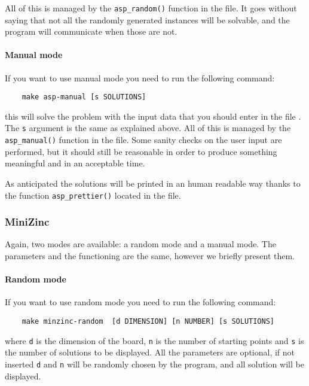 All of this is managed by the \texttt{asp_random()} function in the  file. 
It goes without saying that not all the randomly generated instances will be solvable, and the program will communicate when those are not.

\paragraph{Manual mode}

If you want to use manual mode you need to run the following command:
\begin{verbatim}
    make asp-manual [s SOLUTIONS]
\end{verbatim}
this will solve the problem with the input data that you should enter in the file . The \texttt{s} argument is the same as explained above. All of this is managed by the \texttt{asp_manual()} function in the  file.
Some sanity checks on the user input are performed, but it should still be reasonable in order to produce something meaningful and in an acceptable time.

As anticipated the solutions will be printed in an human readable way thanks to the function \texttt{asp_prettier()} located in the  file.

\subsubsection{MiniZinc}
Again, two modes are available: a random mode and a manual mode. The parameters and the functioning are the same, however we briefly present them.

\paragraph{Random mode}

If you want to use random mode you need to run the following command:
\begin{verbatim}
    make minzinc-random  [d DIMENSION] [n NUMBER] [s SOLUTIONS]
\end{verbatim}
where \texttt{d} is the dimension of the board, \texttt{n} is the number of starting points and \texttt{s} is the number of solutions to be displayed. All the parameters are optional, if not inserted  \texttt{d} and  \texttt{n} will be randomly chosen by the program, and all solution will be displayed.


